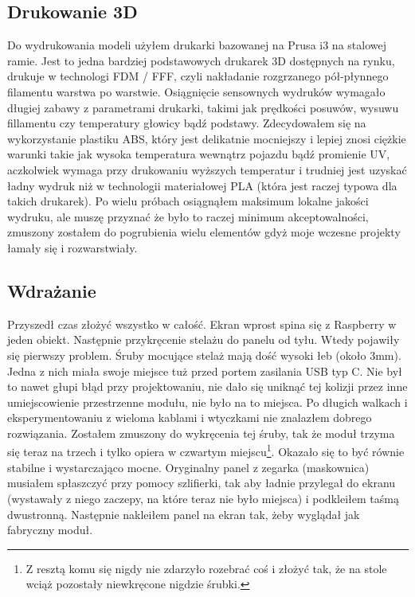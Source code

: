 \documentclass[declaration,shortabstract, inz]{iithesis}
\begin{document}
  
\subsection{Drukowanie 3D}
    Do wydrukowania modeli użyłem drukarki bazowanej na Prusa i3 na stalowej ramie. Jest to jedna bardziej podstawowych drukarek 3D dostępnych na rynku, drukuje w technologi FDM / FFF, czyli nakładanie rozgrzanego pół-płynnego filamentu warstwa po warstwie. Osiągnięcie sensownych wydruków wymagało długiej zabawy z parametrami drukarki, takimi jak prędkości posuwów, wysuwu fillamentu czy temperatury głowicy bądź podstawy. Zdecydowałem się na wykorzystanie plastiku ABS, który jest delikatnie mocniejszy i lepiej znosi ciężkie warunki takie jak wysoka temperatura wewnątrz pojazdu bądź promienie UV, aczkolwiek wymaga przy drukowaniu wyższych temperatur i trudniej jest uzyskać ładny wydruk niż w technologii materiałowej PLA (która jest raczej typowa dla takich drukarek). Po wielu próbach osiągnąłem maksimum lokalne jakości wydruku, ale muszę przyznać że było to raczej minimum akceptowalności, zmuszony zostałem do pogrubienia wielu elementów gdyż moje wczesne projekty łamały się i rozwarstwiały.


\subsection{Wdrażanie}
    Przyszedł czas złożyć wszystko w całość. Ekran wprost spina się z Raspberry w jeden obiekt. Następnie przykręcenie stelażu do panelu od tyłu. Wtedy pojawiły się pierwszy problem. Śruby mocujące stelaż mają dość wysoki łeb (około 3mm). Jedna z nich miała swoje miejsce tuż przed portem zasilania USB typ C. Nie był to nawet głupi błąd przy projektowaniu, nie dało się uniknąć tej kolizji przez inne umiejscowienie przestrzenne modułu, nie było na to miejsca. Po długich walkach i eksperymentowaniu z wieloma kablami i wtyczkami nie znalazłem dobrego rozwiązania. Zostałem zmuszony do wykręcenia tej śruby, tak że moduł trzyma się teraz na trzech i tylko opiera w czwartym miejscu\footnote{Z resztą komu się nigdy nie zdarzyło rozebrać coś i złożyć tak, że na stole wciąż pozostały niewkręcone nigdzie śrubki.}. Okazało się to być równie stabilne i wystarczająco mocne. Oryginalny panel z zegarka (maskownica) musiałem spłaszczyć przy pomocy szlifierki, tak aby ładnie przylegał do ekranu (wystawały z niego zaczepy, na które teraz nie było miejsca) i podkleiłem taśmą dwustronną. Następnie nakleiłem panel na ekran tak, żeby wyglądał jak fabryczny moduł.
    
\end{document}
